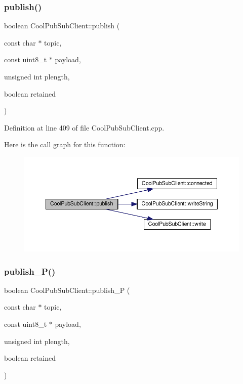 \subsubsection{\texorpdfstring{publish()}{publish()}\hspace{0.1cm}{\footnotesize\ttfamily [4/4]}}
{\footnotesize\ttfamily boolean Cool\+Pub\+Sub\+Client\+::publish (\begin{DoxyParamCaption}\item[{const char $\ast$}]{topic,  }\item[{const uint8\+\_\+t $\ast$}]{payload,  }\item[{unsigned int}]{plength,  }\item[{boolean}]{retained }\end{DoxyParamCaption})}



Definition at line 409 of file Cool\+Pub\+Sub\+Client.\+cpp.

Here is the call graph for this function\+:
\nopagebreak
\begin{figure}[H]
\begin{center}
\leavevmode
\includegraphics[width=350pt]{class_cool_pub_sub_client_adef968760eb87b70e3fed03e60da76f7_cgraph}
\end{center}
\end{figure}
\mbox{\label{class_cool_pub_sub_client_a55458d47cf01f590e9b6647d5a418ab6}} 
\subsubsection{\texorpdfstring{publish\+\_\+\+P()}{publish\_P()}}
{\footnotesize\ttfamily boolean Cool\+Pub\+Sub\+Client\+::publish\+\_\+P (\begin{DoxyParamCaption}\item[{const char $\ast$}]{topic,  }\item[{const uint8\+\_\+t $\ast$}]{payload,  }\item[{unsigned int}]{plength,  }\item[{boolean}]{retained }\end{DoxyParamCaption})}



